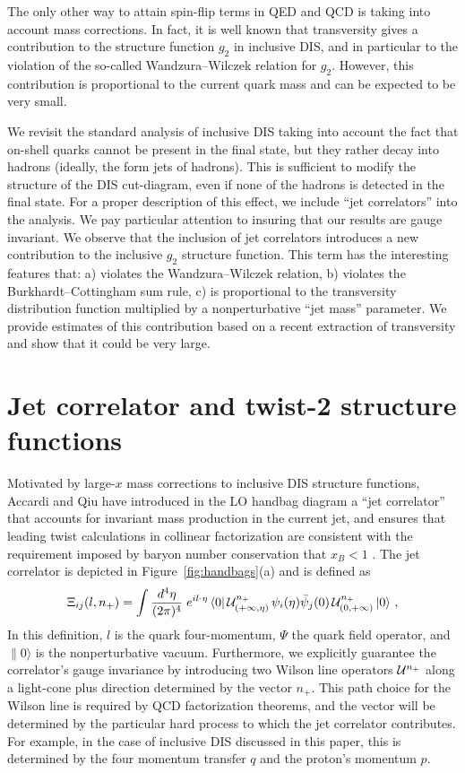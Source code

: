 \documentclass[preprintnumbers,floatfix,nofootinbib]{revtex4}
\newcommand{\de}{d}                    %
\begin{document}
The only other way to attain spin-flip terms in QED and QCD is taking into
account mass corrections. In fact, it is well known that transversity gives a
contribution to the structure function $g_2$ in inclusive DIS, and in
particular to the violation of the so-called Wandzura--Wilczek relation for
$g_2$. However, this contribution is proportional to the current quark mass
and can be expected to be very small.

We revisit the standard analysis of inclusive DIS taking into account the fact
that on-shell quarks cannot be present in the final state, but they rather
decay into hadrons (ideally, the form jets of hadrons). This is sufficient to modify the structure of the DIS
cut-diagram, even if none of the hadrons is detected in the final
state. For a proper description of this effect, we include ``jet
correlators'' into the analysis. We pay particular attention to insuring that our
results are gauge invariant. We observe that the inclusion of jet correlators
introduces a new
contribution to the inclusive $g_2$ structure function. This term has the
interesting features that: a) violates the Wandzura--Wilczek relation, b)
violates the Burkhardt--Cottingham sum rule, c) is
proportional to the transversity distribution function multiplied by a
nonperturbative ``jet mass'' parameter. We provide estimates of this
contribution based on a recent extraction of transversity and show that it
could be very large.   
 

\section{Jet correlator and twist-2 structure functions}

Motivated by large-$x$ mass corrections to inclusive DIS structure functions, Accardi and Qiu have introduced in the LO handbag diagram a ``jet correlator'' that accounts for invariant mass production in the current jet, and ensures that leading twist calculations in collinear factorization are consistent with the requirement imposed by baryon number conservation that $x_B<1$ \cite{Accardi-Qiu}. The jet correlator is depicted in Figure~\ref{fig:handbags}(a) and is defined as
\begin{align} 
\Xi_{ij}(l,n_+) =\int
  \frac{\de^4\eta}{(2\pi)^4}\; e^{i l \cdot \eta}\,
    \langle 0|\, {\cal U}^{n_+}_{(+\infty,\eta)}
\,\psi_i(\eta)
             \bar{\psi}_j(0)\,
{\cal U}^{n_+}_{(0,+\infty)}\,   |0 \rangle \ ,
\label{e:xifull}
\end{align} 
In this definition, $l$ is the quark four-momentum, $\Psi$ the quark field operator, and $\|0\rangle$ is the nonperturbative vacuum. Furthermore, we explicitly guarantee the correlator's gauge invariance by introducing two Wilson line operators ${\cal U}^{n_+}$ along a light-cone plus direction determined by the vector $n_+$. This path choice for the Wilson line is required by QCD factorization theorems, and the vector will be determined by the particular hard process to which the jet correlator contributes. For example, in the case of inclusive DIS discussed in this paper, this is determined by the four momentum transfer $q$ and the proton's momentum $p$.
\end{document}
